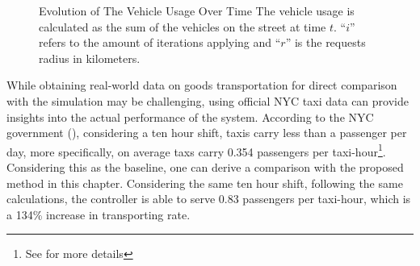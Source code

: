 \begin{figure}[t]
\begin{tikzpicture}
		
		
		
	\end{tikzpicture}
	\caption[Evolution of The Vehicle Usage Over Time]{Evolution of The Vehicle Usage Over Time The vehicle usage is calculated as the sum of the vehicles on the street at time $t$. ``$i$'' refers to the amount of iterations applying  and ``$r$'' is the requests radius in kilometers.}
	\label{fig:vehicle_usage_km_r}
\end{figure}

While obtaining real-world data on goods transportation for direct comparison with the simulation may be challenging, using official NYC taxi data can provide insights into the actual performance of the system. According to the NYC government (\cite{nyc_taxi_history}), considering a ten hour shift, taxis carry less than a passenger per day, more specifically, on average taxs carry 0.354 passengers per taxi-hour\footnote{See  for more details}. Considering this as the baseline, one can derive a comparison with the proposed method in this chapter. Considering the same ten hour shift, following the same calculations, the controller is able to serve 0.83 passengers per taxi-hour, which is a 134\% increase in transporting rate. 

















